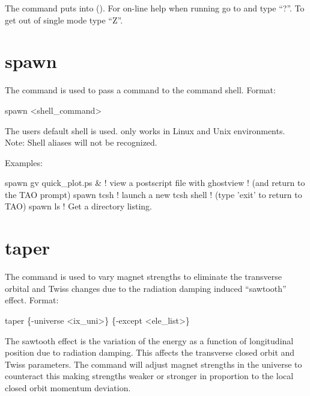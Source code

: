 {{{{{{{{{{{The  command puts \tao into  ().  For on-line help
when running \tao go to  and type ``?''.  To get out of single mode type ``Z''.

\section{spawn}
\label{s:spawn}

The  command is used to pass a command to the command shell. Format:
\begin{example}
  spawn <shell_command>
\end{example}

The users default shell is used.  only works in Linux and Unix environments.
Note: Shell aliases will not be recognized.

Examples:
\begin{example}
  spawn gv quick_plot.ps &      ! view a postscript file with ghostview
                                ! (and return to the TAO prompt)
  spawn tcsh                    ! launch a new tcsh shell 
                                ! (type 'exit' to return to TAO)
  spawn ls                      ! Get a directory listing.
\end{example}


\section{taper}
\label{s:taper}

The  command is used to vary magnet strengths to eliminate the transverse orbital and Twiss
changes due to the radiation damping induced ``sawtooth'' effect. Format:
\begin{example}
  taper \{-universe <ix_uni>\} \{-except <ele_list>\}
\end{example}

The sawtooth effect is the variation of the energy as a function of longitudinal position due to
radiation damping. This affects the transverse closed orbit and Twiss parameters. The 
command will adjust magnet strengths in the  universe to counteract this making strengths
weaker or stronger in proportion to the local closed orbit momentum deviation.

}}}}}}}}}}}
